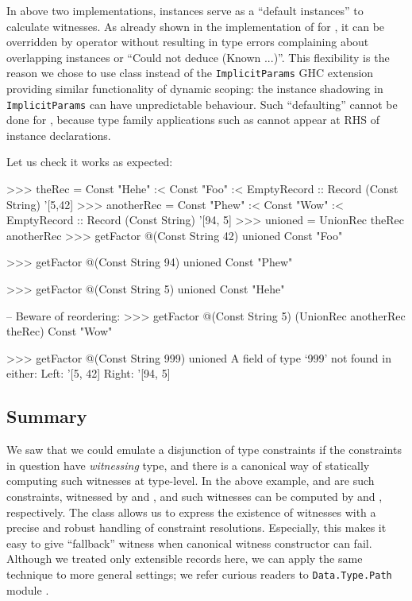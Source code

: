 \documentclass[demotion-paper.tex]{subfiles}
\begin{document}
In above two implementations,  instances serve as a ``default instances'' to calculate witnesses.
As already shown in the implementation of  for , it can be overridden by  operator without resulting in type errors complaining about overlapping instances or ``Could not deduce (Known ...)''.
This flexibility is the reason we chose to use  class instead of the \texttt{ImplicitParams} GHC extension providing similar functionality of dynamic scoping:  the instance shadowing in \texttt{ImplicitParams} can have unpredictable behaviour.
Such ``defaulting'' cannot be done for , because type family applications such as  cannot appear at RHS of instance declarations.

Let us check it works as expected:

\begin{repl}
>>> theRec = Const "Hehe" :< Const "Foo"
      :< EmptyRecord
      :: Record (Const String) '[5,42]
>>> anotherRec = Const "Phew" :< Const "Wow"
      :< EmptyRecord
      :: Record (Const String) '[94, 5]
>>> unioned = UnionRec theRec anotherRec
>>> getFactor @(Const String 42) unioned
Const "Foo"

>>> getFactor @(Const String 94) unioned
Const "Phew"

>>> getFactor @(Const String 5) unioned
Const "Hehe"

-- Beware of reordering:
>>> getFactor @(Const String 5) 
      (UnionRec anotherRec theRec)
Const "Wow"

>>> getFactor @(Const String 999) unioned
A field of type `999' not found in either:
   Left: '[5, 42]
  Right: '[94, 5]
\end{repl}

\subsection{Summary}
We saw that we could emulate a disjunction of type constraints if the constraints in question have \emph{witnessing} type, and there is a canonical way of statically computing such witnesses at type-level.
In the above example,  and  are such constraints, witnessed by  and , and such witnesses can be computed by  and , respectively.
The  class allows us to express the existence of witnesses with a precise and robust handling of constraint resolutions.
Especially, this makes it easy to give ``fallback'' witness when canonical witness constructor can fail.
Although we treated only extensible records here, we can apply the same technique to more general settings;
we refer curious readers to \texttt{Data.Type.Path} module %
.
\end{document}
